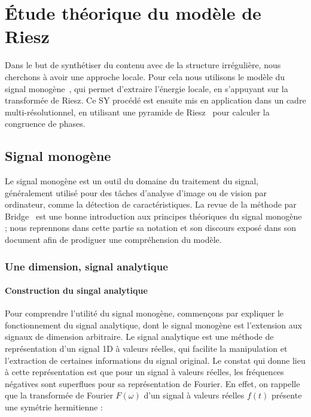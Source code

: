 \chapter[Modèle de Riesz]{Étude théorique du modèle de Riesz} %
\label{chap:chapitre1}

Dans le but de synthétiser du contenu avec de la structure irrégulière, nous cherchons à avoir une approche locale. Pour cela nous utilisons le modèle du signal monogène~\cite{felsberg_monogenic_2001}, qui permet d'extraire l'énergie locale, en s'appuyant sur la transformée de Riesz. Ce SY procédé est ensuite mis en application dans un cadre multi-résolutionnel, en utilisant une pyramide de Riesz~\cite{wadhwa_riesz_2014} pour calculer la congruence de phases.

\section{Signal monogène}

Le signal monogène est un outil du domaine du traitement du signal, généralement utilisé pour des tâches d'analyse d'image ou de vision par ordinateur, comme la détection de caractéristiques. La revue de la méthode par Bridge~\cite{bridge_introduction_2018} est une bonne introduction aux principes théoriques du signal monogène ; nous reprennons dans cette partie sa notation et son discours exposé dans son document afin de prodiguer une compréhension du modèle.

\subsection{Une dimension, signal analytique}

\subsubsection{Construction du singal analytique}

Pour comprendre l'utilité du signal monogène, commençons par expliquer le fonctionnement du signal analytique, dont le signal monogène est l'extension aux signaux de dimension arbitraire. Le signal analytique est une méthode de représentation d'un signal 1D à valeurs réelles, qui facilite la manipulation et l'extraction de certaines informations du signal original. Le constat qui donne lieu à cette représentation est que pour un signal à valeurs réelles, les fréquences négatives sont superflues pour sa représentation de Fourier. En effet, on rappelle que la transformée de Fourier $F(\omega)$ d'un signal à valeurs réelles $f(t)$ présente une symétrie hermitienne :

